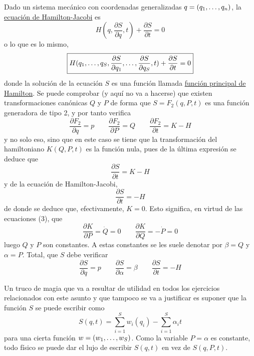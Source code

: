 \documentclass[12pt]{report}
\begin{document}
Dado un sistema mecánico con coordenadas generalizadas $q =(q_1,\mathellipsis,q_n)$, la \ul{ecuación de Hamilton-Jacobi} es
\[\boxed{H(q,\frac{\partial S}{\partial q},t) +\frac{\partial S}{\partial t} = 0}\]
o lo que es lo mismo,
\[\boxed{H(q_1,\mathellipsis,q_S,\frac{\partial S}{\partial q_1},\mathellipsis,\frac{\partial S}{\partial q_S},t) +\frac{\partial S}{\partial t} = 0}\]
donde la solución de la ecuación $S$ es una función llamada \ul{función principal de Hamilton}. Se puede comprobar (y aquí no va a hacerse) que existen transformaciones canónicas $Q$ y $P$ de forma que $S = F_2(q,P,t)$ es una función generadora de tipo 2, y por tanto verifica
\[\frac{\partial F_2}{\partial q} = p \qquad \frac{\partial F_2}{\partial P} = Q \qquad \frac{\partial F_2}{\partial t} = K-H\]
y no solo eso, sino que en este caso se tiene que la transformación del hamiltoniano $K(Q,P,t)$ es la función nula, pues de la última expresión se deduce que
\[\frac{\partial S}{\partial t} = K - H\]
y de la ecuación de Hamilton-Jacobi,
\[\frac{\partial S}{\partial t} = - H\]
de donde se deduce que, efectivamente, $K = 0$. Esto significa, en virtud de las ecuaciones (3), que
\[\frac{\partial K}{\partial P} = \dot{Q} = 0 \qquad \frac{\partial K}{\partial Q} = - \dot{P} = 0\]
luego $Q$ y $P$ son constantes. A estas constantes se les suele denotar por $\beta = Q$ y $\alpha = P$. Total, que $S$ debe verificar
\[\boxed{\frac{\partial S}{\partial q} = p }\qquad \boxed{\frac{\partial S}{\partial \alpha} = \beta} \qquad \boxed{\frac{\partial S}{\partial t} = - H}\]

\vspace{2mm}
Un truco de magia que va a resultar de utilidad en todos los ejercicios relacionados con este asunto y que tampoco se va a justificar es suponer que la función $S$ se puede escribir como
\[\boxed{S(q,t) = \sum_{i=1}^S w_i(q_i) - \sum_{i=1}^S \alpha_it}\]
para una cierta función $w = (w_1,\mathellipsis,w_S)$. Como la variable $P = \alpha$ es constante, todo físico se puede dar el lujo de escribir $S(q,t)$ en vez de $S(q,P,t)$.
\end{document}
